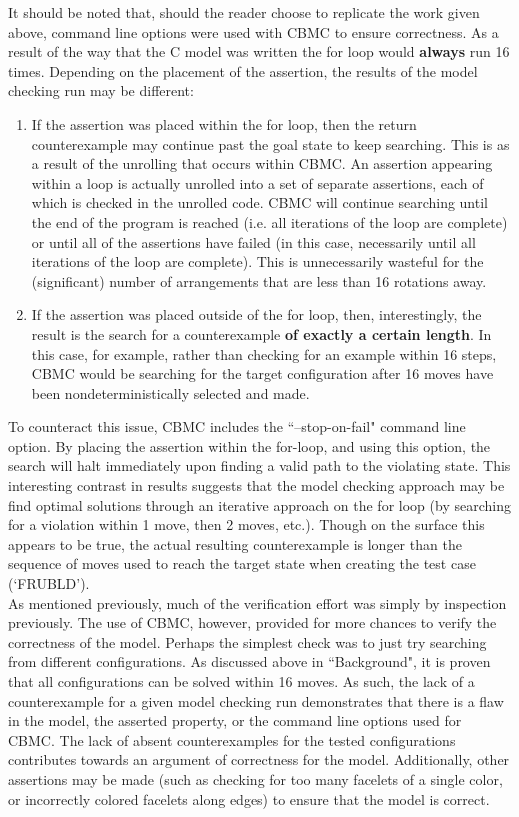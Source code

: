 \documentclass{article}
\begin{document}
It should be noted that, should the reader choose to replicate the work given above, command line options were used with CBMC to ensure correctness. As a result of the way that the C model was written the for loop would \textbf{always} run 16 times. Depending on the placement of the assertion, the results of the model checking run may be different:

\begin{enumerate}
\item If the assertion was placed within the for loop, then the return counterexample may continue past the goal state to keep searching. This is as a result of the unrolling that occurs within CBMC. An assertion appearing within a loop is actually unrolled into a set of separate assertions, each of which is checked in the unrolled code. CBMC will continue searching until the end of the program is reached (i.e. all iterations of the loop are complete) or until all of the assertions have failed (in this case, necessarily until all iterations of the loop are complete). This is unnecessarily wasteful for the (significant) number of arrangements that are less than 16 rotations away.
\item If the assertion was placed outside of the for loop, then, interestingly, the result is the search for a counterexample \textbf{of exactly a certain length}. In this case, for example, rather than checking for an example within 16 steps, CBMC would be searching for the target configuration after 16 moves have been nondeterministically selected and made.
\end{enumerate}

\noindent To counteract this issue, CBMC includes the ``--stop-on-fail" command line option. By placing the assertion within the for-loop, and using this option, the search will halt immediately upon finding a valid path to the violating state. This interesting contrast in results suggests that the model checking approach may be find optimal solutions through an iterative approach on the for loop (by searching for a violation within 1 move, then 2 moves, etc.). Though on the surface this appears to be true, the actual resulting counterexample is longer than the sequence of moves used to reach the target state when creating the test case (`FRUBLD').\\

\noindent As mentioned previously, much of the verification effort was simply by inspection previously. The use of CBMC, however, provided for more chances to verify the correctness of the model. Perhaps the simplest check was to just try searching from different configurations. As discussed above in ``Background", it is proven that all configurations can be solved within 16 moves. As such, the lack of a counterexample for a given model checking run demonstrates that there is a flaw in the model, the asserted property, or the command line options used for CBMC. The lack of absent counterexamples for the tested configurations contributes towards an argument of correctness for the model. Additionally, other assertions may be made (such as checking for too many facelets of a single color, or incorrectly colored facelets along edges) to ensure that the model is correct.
\end{document}
